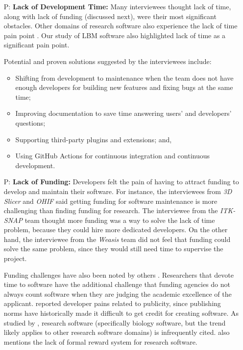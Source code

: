 \documentclass[final, 3p, times, authoryear]{elsarticle}
\newcounter{pnum} %
\begin{document}
\begin{enumerate}

\item[P\refstepcounter{pnum}\thepnum \label{P_LackDevTime}:] \textbf{Lack of
Development Time:} Many interviewees thought lack of time, along with lack of
funding (discussed next), were their most significant obstacles. Other domains
of research software also experience the lack of time pain point
\citep{PintoEtAl2018, PintoEtAl2016, WieseEtAl2019}. Our study of LBM software
\citep{SmithEtAl2022} also highlighted lack of time as a significant pain point.

Potential and proven solutions suggested by the interviewees include:

\begin{itemize}
\item Shifting from development to maintenance when the team does not have
enough developers for building new features and fixing bugs at the same time;
\item Improving documentation to save time answering users' and developers'
questions;
\item Supporting third-party plugins and extensions; and,
\item Using GitHub Actions for continuous integration and continuous
development.
\end{itemize}

\item[P\refstepcounter{pnum}\thepnum \label{P_LackFunding}:] \textbf{Lack of
Funding:} Developers felt the pain of having to attract funding to develop and
maintain their software. For instance, the interviewees from \textit{3D Slicer}
and \textit{OHIF} said getting funding for software maintenance is more
challenging than finding funding for research. The interviewee from the
\textit{ITK-SNAP} team thought more funding was a way to solve the lack of time
problem, because they could hire more dedicated developers. On the other hand,
the interviewee from the \textit{Weasis} team did not feel that funding could
solve the same problem, since they would still need time to supervise the project. 

Funding challenges have also been noted by others \citep{GewaltigAndCannon2012,
Goble2014, KaterbowAndFeulner2018, SmithEtAl2022}. Researchers that devote time
to software have the additional challenge that funding agencies do not always
count software when they are judging the academic excellence of the applicant.
\citet{WieseEtAl2019} reported developer pains related to publicity, since
publishing norms have historically made it difficult to get credit for creating
software.  As studied by \citet{HowisonAndBullard2016}, research software
(specifically biology software, but the trend likely applies to other research
software domains) is infrequently cited. \citet{PintoEtAl2018} also mentions the
lack of formal reward system for research software.


\end{enumerate}
\end{document}
